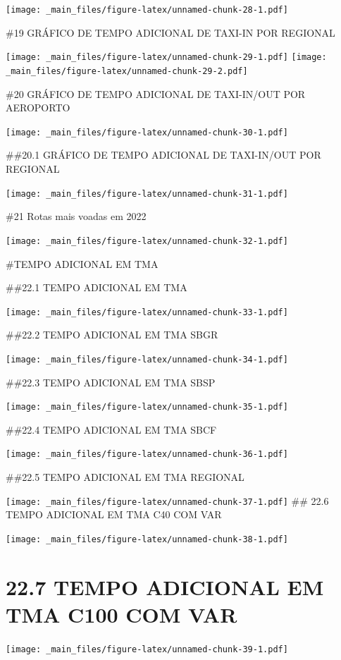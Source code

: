 \documentclass[
]{book}
\theoremstyle{definition}
\theoremstyle{definition}
\theoremstyle{definition}
\theoremstyle{definition}
\theoremstyle{remark}
\begin{document}
\texttt{[image: \_main\_files/figure-latex/unnamed-chunk-28-1.pdf]}

\#19 GRÁFICO DE TEMPO ADICIONAL DE TAXI-IN POR REGIONAL

\texttt{[image: \_main\_files/figure-latex/unnamed-chunk-29-1.pdf]} \texttt{[image: \_main\_files/figure-latex/unnamed-chunk-29-2.pdf]}

\#20 GRÁFICO DE TEMPO ADICIONAL DE TAXI-IN/OUT POR AEROPORTO

\texttt{[image: \_main\_files/figure-latex/unnamed-chunk-30-1.pdf]}

\#\#20.1 GRÁFICO DE TEMPO ADICIONAL DE TAXI-IN/OUT POR REGIONAL

\texttt{[image: \_main\_files/figure-latex/unnamed-chunk-31-1.pdf]}

\#21 Rotas mais voadas em 2022

\texttt{[image: \_main\_files/figure-latex/unnamed-chunk-32-1.pdf]}

\#TEMPO ADICIONAL EM TMA

\#\#22.1 TEMPO ADICIONAL EM TMA

\texttt{[image: \_main\_files/figure-latex/unnamed-chunk-33-1.pdf]}

\#\#22.2 TEMPO ADICIONAL EM TMA SBGR

\texttt{[image: \_main\_files/figure-latex/unnamed-chunk-34-1.pdf]}

\#\#22.3 TEMPO ADICIONAL EM TMA SBSP

\texttt{[image: \_main\_files/figure-latex/unnamed-chunk-35-1.pdf]}

\#\#22.4 TEMPO ADICIONAL EM TMA SBCF

\texttt{[image: \_main\_files/figure-latex/unnamed-chunk-36-1.pdf]}

\#\#22.5 TEMPO ADICIONAL EM TMA REGIONAL

\texttt{[image: \_main\_files/figure-latex/unnamed-chunk-37-1.pdf]}
\#\# 22.6 TEMPO ADICIONAL EM TMA C40 COM VAR

\texttt{[image: \_main\_files/figure-latex/unnamed-chunk-38-1.pdf]}

\hypertarget{tempo-adicional-em-tma-c100-com-var}{%
\section{22.7 TEMPO ADICIONAL EM TMA C100 COM VAR}\label{tempo-adicional-em-tma-c100-com-var}}

\texttt{[image: \_main\_files/figure-latex/unnamed-chunk-39-1.pdf]}
\end{document}
